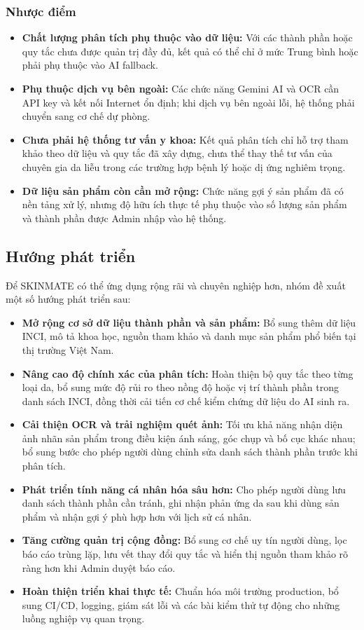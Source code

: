 \documentclass[12pt,a4paper]{article}
\begin{document}
\subsubsection{Nhược điểm}

\begin{itemize}
    \item \textbf{Chất lượng phân tích phụ thuộc vào dữ liệu:} Với các thành phần hoặc quy tắc chưa được quản trị đầy đủ, kết quả có thể chỉ ở mức Trung bình hoặc phải phụ thuộc vào AI fallback.
    \item \textbf{Phụ thuộc dịch vụ bên ngoài:} Các chức năng Gemini AI và OCR cần API key và kết nối Internet ổn định; khi dịch vụ bên ngoài lỗi, hệ thống phải chuyển sang cơ chế dự phòng.
    \item \textbf{Chưa phải hệ thống tư vấn y khoa:} Kết quả phân tích chỉ hỗ trợ tham khảo theo dữ liệu và quy tắc đã xây dựng, chưa thể thay thế tư vấn của chuyên gia da liễu trong các trường hợp bệnh lý hoặc dị ứng nghiêm trọng.
    \item \textbf{Dữ liệu sản phẩm còn cần mở rộng:} Chức năng gợi ý sản phẩm đã có nền tảng xử lý, nhưng độ hữu ích thực tế phụ thuộc vào số lượng sản phẩm và thành phần được Admin nhập vào hệ thống.
\end{itemize}

\subsection{Hướng phát triển}

Để SKINMATE có thể ứng dụng rộng rãi và chuyên nghiệp hơn, nhóm đề xuất một số hướng phát triển sau:

\begin{itemize}
    \item \textbf{Mở rộng cơ sở dữ liệu thành phần và sản phẩm:} Bổ sung thêm dữ liệu INCI, mô tả khoa học, nguồn tham khảo và danh mục sản phẩm phổ biến tại thị trường Việt Nam.
    \item \textbf{Nâng cao độ chính xác của phân tích:} Hoàn thiện bộ quy tắc theo từng loại da, bổ sung mức độ rủi ro theo nồng độ hoặc vị trí thành phần trong danh sách INCI, đồng thời cải tiến cơ chế kiểm chứng dữ liệu do AI sinh ra.
    \item \textbf{Cải thiện OCR và trải nghiệm quét ảnh:} Tối ưu khả năng nhận diện ảnh nhãn sản phẩm trong điều kiện ánh sáng, góc chụp và bố cục khác nhau; bổ sung bước cho phép người dùng chỉnh sửa danh sách thành phần trước khi phân tích.
    \item \textbf{Phát triển tính năng cá nhân hóa sâu hơn:} Cho phép người dùng lưu danh sách thành phần cần tránh, ghi nhận phản ứng da sau khi dùng sản phẩm và nhận gợi ý phù hợp hơn với lịch sử cá nhân.
    \item \textbf{Tăng cường quản trị cộng đồng:} Bổ sung cơ chế uy tín người dùng, lọc báo cáo trùng lặp, lưu vết thay đổi quy tắc và hiển thị nguồn tham khảo rõ ràng hơn khi Admin duyệt báo cáo.
    \item \textbf{Hoàn thiện triển khai thực tế:} Chuẩn hóa môi trường production, bổ sung CI/CD, logging, giám sát lỗi và các bài kiểm thử tự động cho những luồng nghiệp vụ quan trọng.
\end{itemize}
\end{document}
